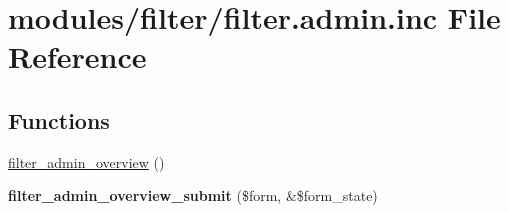 \hypertarget{filter_8admin_8inc}{
\section{modules/filter/filter.admin.inc File Reference}
\label{filter_8admin_8inc}
}
\subsection*{Functions}
\begin{CompactItemize}
\item 
\hyperlink{group__forms_gfef1e200ed76ee122718a52cf9abb0f2}{filter\_\-admin\_\-overview} ()
\item 
\hypertarget{filter_8admin_8inc_60b5bbf55b2f0678c64ae17f613d03d0}{
\textbf{filter\_\-admin\_\-overview\_\-submit} (\$form, \&\$form\_\-state)}
\label{filter_8admin_8inc_60b5bbf55b2f0678c64ae17f613d03d0}


\end{CompactItemize}
